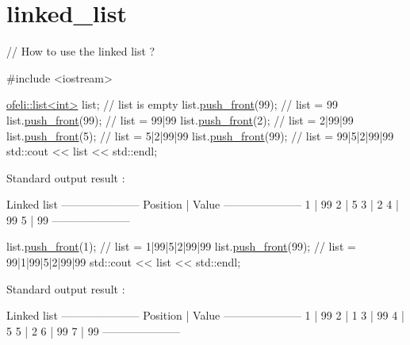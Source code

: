\hypertarget{linked_list-example}{\section{linked\-\_\-list}
}

\begin{DoxyCode}
\textcolor{comment}{// How to use the linked list ?}

\textcolor{preprocessor}{#include <iostream>}

\hyperlink{classofeli_1_1list}{ofeli::list<int>} list; \textcolor{comment}{// list is empty}
list.\hyperlink{classofeli_1_1list_a87b7f6a90670e08d99e23f3377b001f9}{push\_front}(99); \textcolor{comment}{// list = 99}
list.\hyperlink{classofeli_1_1list_a87b7f6a90670e08d99e23f3377b001f9}{push\_front}(99); \textcolor{comment}{// list = 99|99}
list.\hyperlink{classofeli_1_1list_a87b7f6a90670e08d99e23f3377b001f9}{push\_front}(2);  \textcolor{comment}{// list = 2|99|99}
list.\hyperlink{classofeli_1_1list_a87b7f6a90670e08d99e23f3377b001f9}{push\_front}(5);  \textcolor{comment}{// list = 5|2|99|99}
list.\hyperlink{classofeli_1_1list_a87b7f6a90670e08d99e23f3377b001f9}{push\_front}(99); \textcolor{comment}{// list = 99|5|2|99|99}
std::cout << list << std::endl;
\end{DoxyCode}
 
\begin{DoxyCode}
Standard output result :

     Linked list
---------------------
 Position | Value
---------------------
    1     |   99
    2     |   5
    3     |   2
    4     |   99
    5     |   99
---------------------
\end{DoxyCode}
 
\begin{DoxyCode}
list.\hyperlink{classofeli_1_1list_a87b7f6a90670e08d99e23f3377b001f9}{push\_front}(1);  \textcolor{comment}{// list = 1|99|5|2|99|99}
list.\hyperlink{classofeli_1_1list_a87b7f6a90670e08d99e23f3377b001f9}{push\_front}(99); \textcolor{comment}{// list = 99|1|99|5|2|99|99}
std::cout << list << std::endl;
\end{DoxyCode}
 
\begin{DoxyCode}
Standard output result :

     Linked list
---------------------
 Position | Value
---------------------
    1     |   99
    2     |   1
    3     |   99
    4     |   5
    5     |   2
    6     |   99
    7     |   99
---------------------
\end{DoxyCode}
 
